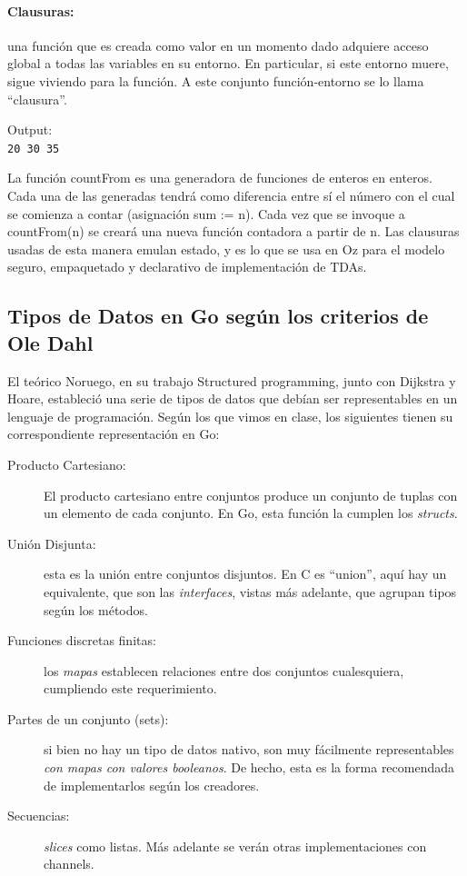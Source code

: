 \documentclass{article}
\begin{document}
\paragraph{Clausuras:} una función que es creada como valor en un momento dado adquiere acceso global a todas las variables en su entorno. En particular, si este entorno muere, sigue viviendo para la función. A este conjunto función-entorno se lo llama ``clausura''.

Output:\\
\verb|20 30 35|

La función countFrom es una generadora de funciones de enteros en enteros. Cada una de las generadas tendrá como diferencia entre sí el número con el cual se comienza a contar (asignación sum := n). Cada vez que se invoque a countFrom(n) se creará una nueva función contadora a partir de n. Las clausuras usadas de esta manera emulan estado, y es lo que se usa en Oz para el modelo seguro, empaquetado y declarativo de implementación de TDAs.


\subsection{Tipos de Datos en Go según los criterios de Ole Dahl}
El teórico Noruego, en su trabajo Structured programming\cite{ole}, junto con Dijkstra y Hoare, estableció una serie de tipos de datos que debían ser representables en un lenguaje de programación. Según los que vimos en clase, los siguientes tienen su correspondiente representación en Go:
\begin{description}
\item[Producto Cartesiano:] El producto cartesiano entre conjuntos produce un conjunto de tuplas con un elemento de cada conjunto. En Go, esta función la cumplen los \emph{structs}.
\item[Unión Disjunta:] esta es la unión entre conjuntos disjuntos. En C es ``union'', aquí hay un equivalente, que son las \emph{interfaces}, vistas más adelante, que agrupan tipos según los métodos.
\item[Funciones discretas finitas:] los \emph{mapas} establecen relaciones entre dos conjuntos cualesquiera, cumpliendo este requerimiento.
\item[Partes de un conjunto (sets):] si bien no hay un tipo de datos nativo, son muy fácilmente representables \emph{con mapas con valores booleanos}. De hecho, esta es la forma recomendada de implementarlos según los creadores\cite{sets}.
\item[Secuencias:] \emph{slices} como listas. Más adelante se verán otras implementaciones con channels. %
\end{description}
\end{document}
